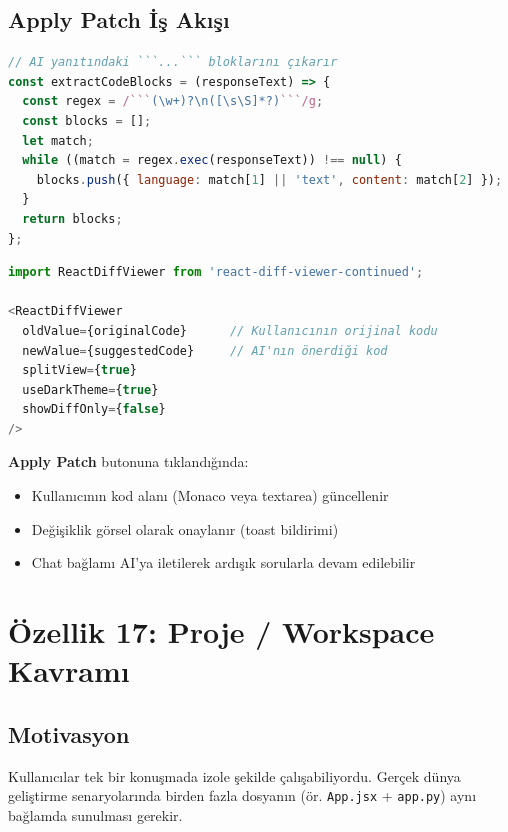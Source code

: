 \documentclass[12pt,a4paper]{article}
\begin{document}
\subsection{Apply Patch İş Akışı}

\begin{lstlisting}[language=JavaScript, caption={Kod bloğundan patch çıkarma}]
// AI yanıtındaki ```...``` bloklarını çıkarır
const extractCodeBlocks = (responseText) => {
  const regex = /```(\w+)?\n([\s\S]*?)```/g;
  const blocks = [];
  let match;
  while ((match = regex.exec(responseText)) !== null) {
    blocks.push({ language: match[1] || 'text', content: match[2] });
  }
  return blocks;
};
\end{lstlisting}

\begin{lstlisting}[language=JavaScript, caption={Diff görüntüleme bileşeni}]
import ReactDiffViewer from 'react-diff-viewer-continued';

<ReactDiffViewer
  oldValue={originalCode}      // Kullanıcının orijinal kodu
  newValue={suggestedCode}     // AI'nın önerdiği kod
  splitView={true}
  useDarkTheme={true}
  showDiffOnly={false}
/>
\end{lstlisting}

\textbf{Apply Patch} butonuna tıklandığında:
\begin{itemize}
  \item Kullanıcının kod alanı (Monaco veya textarea) güncellenir
  \item Değişiklik görsel olarak onaylanır (toast bildirimi)
  \item Chat bağlamı AI'ya iletilerek ardışık sorularla devam edilebilir
\end{itemize}

\newpage

\section{Özellik 17: Proje / Workspace Kavramı}

\subsection{Motivasyon}
Kullanıcılar tek bir konuşmada izole şekilde çalışabiliyordu. Gerçek dünya geliştirme senaryolarında birden fazla dosyanın (ör. \texttt{App.jsx} + \texttt{app.py}) aynı bağlamda sunulması gerekir.
\end{document}
